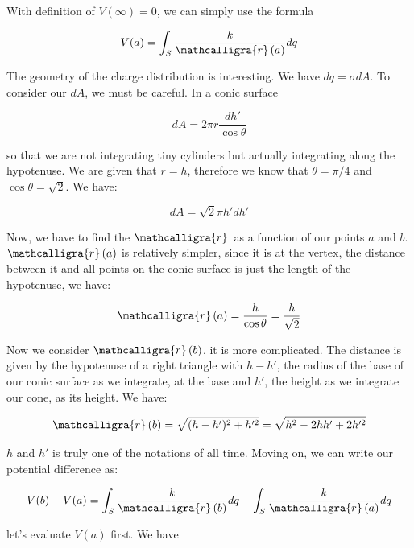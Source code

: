 \documentclass{article}
\newcommand{\scriptr}{\mathcalligra{r}\,}
\numberwithin{equation}{section}
\numberwithin{figure}{section}
\begin{document}
With definition of $V(\infty) = 0$, we can simply use the formula

\begin{equation}
    V(a) = \int_S \frac{k}{\scriptr(a)}dq
\end{equation}

The geometry of the charge distribution is interesting. We have $dq = \sigma dA$. To consider our $dA$, we must be careful. In a conic surface

\begin{equation}
    dA = 2\pi r \frac{dh'}{\cos \theta}
\end{equation}

so that we are not integrating tiny cylinders but actually integrating along the hypotenuse. We are given that $r = h$, therefore we know that $\theta = \pi /4 $ and $\cos \theta = \sqrt{2}$. We have:

\begin{equation}
    dA = \sqrt{2} \pi h' dh'
\end{equation}

Now, we have to find the $\scriptr$ as a function of our points $a$ and $b$. $\scriptr(a)$ is relatively simpler, since it is at the vertex, the distance between it and all points on the conic surface is just the length of the hypotenuse, we have:

\begin{equation}
    \scriptr(a) = \frac{h}{\cos \theta} = \frac{h}{\sqrt{2}}
\end{equation}

Now we consider $\scriptr(b)$, it is more complicated. The distance is given by the hypotenuse of a right triangle with $h - h'$, the radius of the base of our conic surface as we integrate, at the base and $h'$, the height as we integrate our cone, as its height. We have:

\begin{equation}
    \scriptr(b) = \sqrt{(h-h')^2 + h'^2} = \sqrt{h^2 - 2hh' + 2h'^2}
\end{equation}

$h$ and $h'$ is truly one of the notations of all time. Moving on, we can write our potential difference as:

\begin{equation}
    V(b) - V(a) = \int_S \frac{k}{\scriptr(b)} dq - \int_S \frac{k}{\scriptr(a)} dq
\end{equation}

let's evaluate $V(a)$ first. We have
\end{document}
